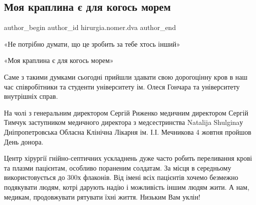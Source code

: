  
 
 
 
 

\subsection{Моя краплина є для когось морем}
\label{sec:04_10_2022.fb.hirurgia.nomer.dva.1.moya_kraplina___dlya}

\ifcmt
 author_begin
   author_id hirurgia.nomer.dva
 author_end
\fi

«Не потрібно думати, що це зробить за тебе хтось інший»

«Моя краплина є для когось морем» 

Саме з такими думками сьогодні прийшли здавати свою дорогоцінну кров в наш час
співробітники та студенти університету ім. Олеся Гончара та університету
внутрішніх справ. 

На чолі з генеральним директором Сергій Риженко медичним директором Сергій
Тимчук заступником медичного директора з медсестринства Natalija  Shulginaу
Дніпропетровська Обласна Клінічна Лікарня ім. І.І. Мечникова 4 жовтня пройшов
День донора. 

Центр хірургії гнійно-септичних ускладнень дуже часто робить переливання крові
та плазми  пацієнтам, особливо пораненим солдатам. За місця в середньому
використовується до 300х флаконів. Від імені всіх пацієнтів хочемо безмежно
подякувати людям, котрі дарують надію і можливість іншим людям жити. А нам,
медикам, продовжувати рятувати їхні життя. Низьким Вам уклін!

